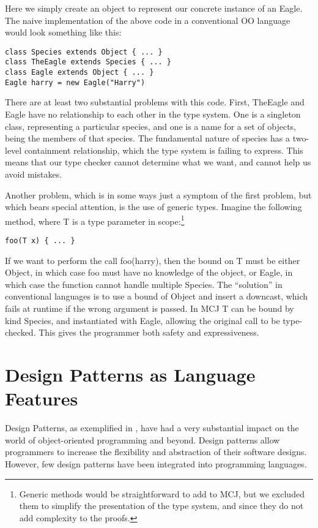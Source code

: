 \documentclass{acmconfbig}
\begin{document}
Here we simply create an object to represent our concrete instance of
an Eagle.  The naive implementation of the above code in a
conventional OO language would look something like this:

\begin{verbatim}
class Species extends Object { ... }
class TheEagle extends Species { ... }
class Eagle extends Object { ... }
Eagle harry = new Eagle("Harry")
\end{verbatim}

There are at least two substantial problems with this code.  First,
{\txt TheEagle} and {\txt Eagle} have no relationship to each other in
the type system.  One is a singleton class, representing a particular
species, and one is a name for a set of objects, being the members of
that species.  The fundamental nature of species has a two-level
containment relationship, which the type system is failing to express.
This means that our type checker cannot determine what we want, and
cannot help us avoid mistakes.

Another problem, which is in some ways just a symptom of the first
problem, but which bears special attention, is the use of generic
types.  Imagine the following method, where T is a type parameter in
scope:\footnote{Generic methods would be straightforward to add to
MCJ, but we excluded them to simplify the presentation of the type
system, and since they do not add complexity to the proofs.}

\begin{verbatim}
foo(T x) { ... }
\end{verbatim}

If we want to perform the call {\txt foo(harry)}, then the bound on
{\txt T} must be either {\txt Object}, in which case {\txt foo} must
have no knowledge of the object, or Eagle, in which case the function
cannot handle multiple {\txt Species}.  The ``solution'' in
conventional languages is to use a bound of {\txt Object} and insert a
downcast, which fails at runtime if the wrong argument is passed.  In
MCJ {\txt T} can be bound by kind {\txt Species}, and instantiated
with {\txt Eagle}, allowing the original call to be type-checked.
This gives the programmer both safety and expressiveness.

\section{Design Patterns as Language Features}
\label{designpatterns}

Design Patterns, as exemplified in \cite{GOF}, have had a very
substantial impact on the world of object-oriented programming and
beyond.  Design patterns allow programmers to increase the flexibility
and abstraction of their software designs.  However, few design
patterns have been integrated into programming languages.
\end{document}
